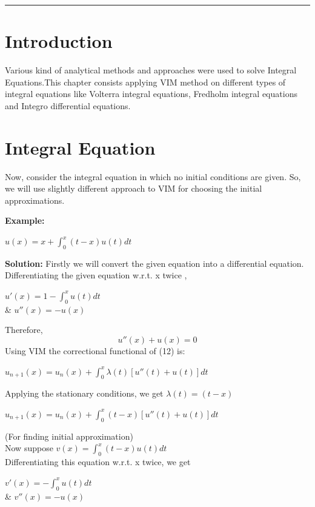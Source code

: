 \documentclass[12pt, a4paper]{report}
\begin{document}
\bigskip %

\rule{\textwidth}{1.4pt} %
\bigskip %

\section{Introduction}
Various kind of analytical methods and approaches were used to solve Integral Equations.This chapter consists applying VIM method on different types of integral equations like Volterra integral equations, Fredholm integral equations and Integro differential equations.

\section{Integral Equation}
Now, consider the integral equation in which no initial conditions are given. So, we will use slightly different approach to VIM for choosing the initial approximations.

\textbf{Example:}
\begin{center}
    $u(x) = x + \int_{0}^{x} (t-x) u(t) dt $
\end{center}

\textbf{Solution: }
Firstly we will convert the given equation into a differential equation. \\
Differentiating the given equation w.r.t. x twice ,\\
\begin{center}
    $ u'(x) = 1 - \int_{0}^{x} u(t) dt $ \\
    & $u''(x) = - u(x) $\\
\end{center}
Therefore,
\begin{equation}
    u''(x)+u(x) = 0 
\end{equation}
Using VIM the correctional functional of (12) is:
\begin{center}
    $u_{n+1}(x) = u_n(x) +\int_{0}^{x} \lambda(t) [u''(t)+u(t)]dt $
\end{center}

Applying the stationary conditions, we get $\lambda(t) = (t-x)$
\begin{center}
    $u_{n+1}(x) = u_n(x) +\int_{0}^{x} (t-x) [u''(t)+u(t)]dt $
\end{center}
(For finding initial approximation) \\ 
Now suppose $v(x) = \int_{0}^{x}(t-x) u(t) dt $ \\
Differentiating this equation w.r.t. x twice, we get \\
\begin{center}
    $v'(x) = - \int_{0}^{x} u(t) dt$ \\
    & $ v''(x) = -u(x)$ \\
\end{center}
\end{document}
